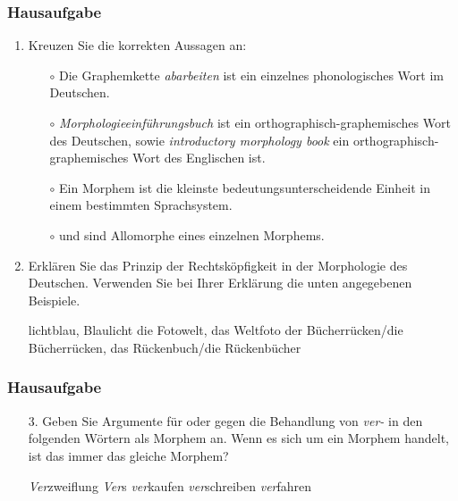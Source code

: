 \begin{frame}
\frametitle{Hausaufgabe}


\begin{enumerate}
	\item Kreuzen Sie die korrekten Aussagen an: %
	
	\begin{itemize}
		\item[$\circ$] Die Graphemkette \emph{abarbeiten} ist ein einzelnes phonologisches Wort im Deutschen.
		\item[$\circ$] \emph{Morphologieeinführungsbuch} ist ein orthographisch-graphemisches Wort des Deutschen, sowie \emph{introductory morphology book} ein orthographisch-graphemisches Wort des Englischen ist.
		\item[$\circ$] Ein Morphem ist die kleinste bedeutungsunterscheidende Einheit in einem bestimmten Sprachsystem.
		\item[$\circ$]  und  sind Allomorphe eines einzelnen Morphems.
	\end{itemize}
	
	\item Erklären Sie das Prinzip der Rechtsköpfigkeit in der Morphologie des Deutschen. Verwenden Sie bei Ihrer Erklärung die unten angegebenen Beispiele. %
	
	\eal\label{ex:05cHA2}
	\ex\label{ex:05cHA2a} lichtblau, Blaulicht
	\ex\label{ex:05cHA2b} die Fotowelt, das Weltfoto
	\ex\label{ex:05cHA2c} der Bücherrücken/die Bücherrücken, das Rückenbuch/die Rückenbücher
	\zl
\end{enumerate}

\end{frame}


\begin{frame}
\frametitle{Hausaufgabe}

\begin{itemize}
\item[3.] Geben Sie Argumente für oder gegen die Behandlung von \emph{ver-} in den folgenden Wörtern als Morphem an. Wenn es sich um ein Morphem handelt, ist das immer das gleiche Morphem? %

\eal\label{ex:05cHA3}
\ex\label{ex:05cHA3a} \emph{Ver}zweiflung
\ex\label{ex:05cHA3b} \emph{Ver}s
\ex\label{ex:05cHA3c} \emph{ver}kaufen
\ex\label{ex:05cHA3d} \emph{ver}schreiben
\ex\label{ex:05cHA3e} \emph{ver}fahren
\zl

\end{itemize}
\end{frame}


